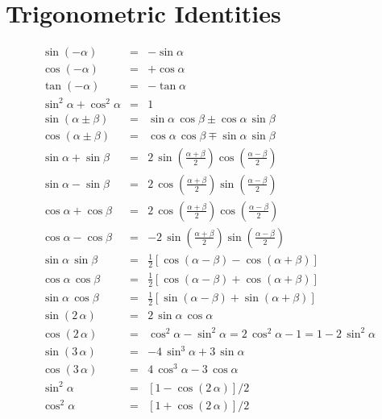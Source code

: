 \section{Trigonometric Identities}
\begin{eqnarray}
\sin(-\alpha) &=& -\sin\alpha\nonumber\\[0.5ex]
\cos(-\alpha)&=&+ \cos\alpha\nonumber\\[0.5ex]
\tan(-\alpha) &=& -\tan\alpha\nonumber\\[0.5ex]
\sin^2\alpha+\cos^2\alpha &=&1\nonumber\\[0.5ex]
\sin(\alpha\pm\beta)&=&\sin\alpha\,\cos\beta\pm \cos\alpha\,\sin\beta\nonumber\\[0.5ex]
\cos(\alpha\pm \beta)&=&\cos\alpha\,\cos\beta\mp \sin\alpha\,\sin\beta\nonumber\\[0.5ex]
\sin\alpha+\sin\beta &=&2\,\sin\left(\frac{\alpha+\beta}{2}\right)\cos\left(\frac{\alpha-\beta}{2}\right)\nonumber\\[0.5ex]
\sin\alpha-\sin\beta &=&2\,\cos\left(\frac{\alpha+\beta}{2}\right)\sin\left(\frac{\alpha-\beta}{2}\right)\nonumber\\[0.5ex]
\cos\alpha+\cos\beta &=&2\,\cos\left(\frac{\alpha+\beta}{2}\right)\cos\left(\frac{\alpha-\beta}{2}\right)\nonumber\\[0.5ex]
\cos\alpha-\cos\beta &=&-2\,\sin\left(\frac{\alpha+\beta}{2}\right)\sin\left(\frac{\alpha-\beta}{2}\right)\nonumber\\[0.5ex]
\sin\alpha\,\sin\beta &=&\frac{1}{2}\left[\cos(\alpha-\beta)-\cos(\alpha+\beta)\right]\nonumber\\[0.5ex]
\cos\alpha\,\cos\beta &=&\frac{1}{2}\left[\cos(\alpha-\beta)+\cos(\alpha+\beta)\right]\nonumber\\[0.5ex]
\sin\alpha\,\cos\beta &=&\frac{1}{2}\left[\sin(\alpha-\beta)+\sin(\alpha+\beta)\right]\nonumber\\[0.5ex]
\sin(2\,\alpha) &=& 2\,\sin\alpha\,\cos\alpha\nonumber\\[0.5ex]
\cos(2\,\alpha)&=&\cos^2\alpha-\sin^2\alpha = 2\,\cos^2\alpha-1=1-2\,\sin^2\alpha\nonumber\\[0.5ex]
\sin(3\,\alpha)&=&-4\,\sin^3\alpha+3\,\sin\alpha\nonumber\\[0.5ex]
\cos(3\,\alpha)&=&4\,\cos^3\alpha-3\,\cos\alpha\nonumber\\[0.5ex]
\sin^2\alpha &=& [1-\cos(2\,\alpha)]/2\nonumber\\[0.5ex]
\cos^2\alpha&=&[1+\cos(2\,\alpha)]/2\nonumber
\end{eqnarray}

